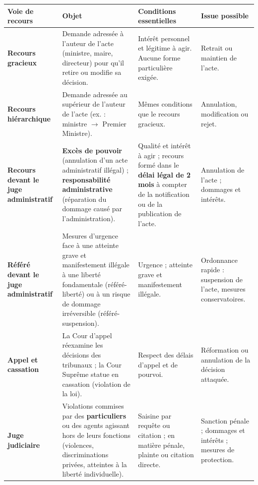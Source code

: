 \documentclass[11pt]{article}
\begin{document}
\begin{center}
\begin{tabularx}{\linewidth}{|l|X|X|X|}
\hline
\rowcolor{popblueL}
\textbf{Voie de recours} & \textbf{Objet} & \textbf{Conditions essentielles} & \textbf{Issue possible} \\
\hline
\textbf{Recours gracieux} & Demande adressée à l'auteur de l'acte (ministre, maire, directeur) pour qu'il retire ou modifie sa décision. & Intérêt personnel et légitime à agir. Aucune forme particulière exigée. & Retrait ou maintien de l'acte. \\
\hline
\textbf{Recours hiérarchique} & Demande adressée au supérieur de l'auteur de l'acte (ex. : ministre $\rightarrow$ Premier Ministre). & Mêmes conditions que le recours gracieux. & Annulation, modification ou rejet. \\
\hline
\textbf{Recours devant le juge administratif} & \textbf{Excès de pouvoir} (annulation d'un acte administratif illégal) ; \textbf{responsabilité administrative} (réparation du dommage causé par l'administration). & Qualité et intérêt à agir ; recours formé dans le \textbf{délai légal de 2 mois} à compter de la notification ou de la publication de l'acte. & Annulation de l'acte ; dommages et intérêts. \\
\hline
\textbf{Référé devant le juge administratif} & Mesures d'urgence face à une atteinte grave et manifestement illégale à une liberté fondamentale (référé-liberté) ou à un risque de dommage irréversible (référé-suspension). & Urgence ; atteinte grave et manifestement illégale. & Ordonnance rapide : suspension de l'acte, mesures conservatoires. \\
\hline
\textbf{Appel et cassation} & La Cour d'appel réexamine les décisions des tribunaux ; la Cour Suprême statue en cassation (violation de la loi). & Respect des délais d'appel et de pourvoi. & Réformation ou annulation de la décision attaquée. \\
\hline
\textbf{Juge judiciaire} & Violations commises par des \textbf{particuliers} ou des agents agissant hors de leurs fonctions (violences, discriminations privées, atteintes à la liberté individuelle). & Saisine par requête ou citation ; en matière pénale, plainte ou citation directe. & Sanction pénale ; dommages et intérêts ; mesures de protection. \\
\hline
\end{tabularx}
\end{center}
\end{document}
